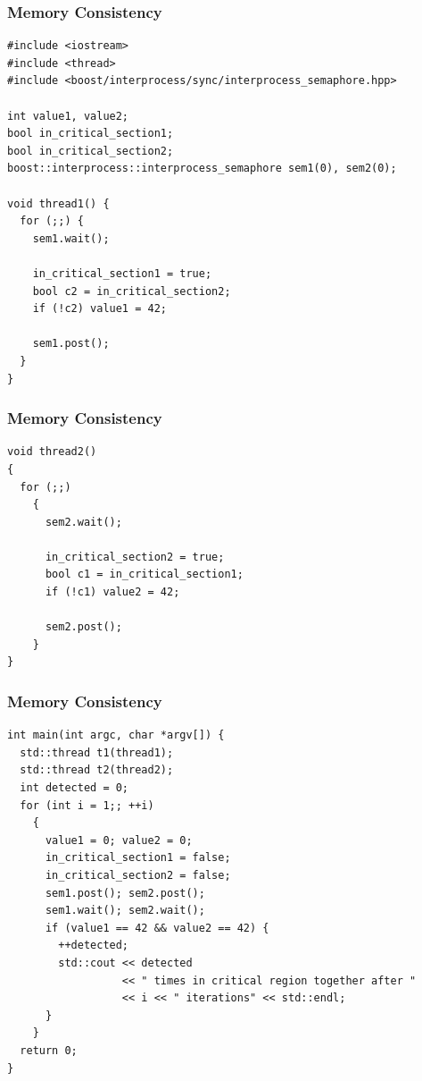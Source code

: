 \documentclass{beamer}
\begin{document}
\begin{frame}[fragile]
\frametitle{Memory Consistency}
\scriptsize
\begin{lstlisting}[linebackgroundcolor={\lstcolorlines{5,6,7,14,15,16}}]
#include <iostream>
#include <thread>
#include <boost/interprocess/sync/interprocess_semaphore.hpp>

int value1, value2;
bool in_critical_section1;
bool in_critical_section2;
boost::interprocess::interprocess_semaphore sem1(0), sem2(0);

void thread1() {
  for (;;) {
    sem1.wait();

    in_critical_section1 = true;
    bool c2 = in_critical_section2;
    if (!c2) value1 = 42;

    sem1.post();
  }
}
\end{lstlisting}

\end{frame}

\begin{frame}[fragile]
\frametitle{Memory Consistency}
\scriptsize
\begin{lstlisting}[linebackgroundcolor={\lstcolorlines{7,8,9}}]
void thread2()
{
  for (;;)
    {
      sem2.wait();

      in_critical_section2 = true;
      bool c1 = in_critical_section1;
      if (!c1) value2 = 42;

      sem2.post();
    }
}
\end{lstlisting}

\end{frame}

\begin{frame}[fragile]
\frametitle{Memory Consistency}
\scriptsize
\begin{lstlisting}[linebackgroundcolor={\lstcolorlines{7,8,9,12,13}}]
int main(int argc, char *argv[]) {
  std::thread t1(thread1);
  std::thread t2(thread2);
  int detected = 0;
  for (int i = 1;; ++i)
    {
      value1 = 0; value2 = 0;
      in_critical_section1 = false;
      in_critical_section2 = false;
      sem1.post(); sem2.post();
      sem1.wait(); sem2.wait();
      if (value1 == 42 && value2 == 42) {
        ++detected;
        std::cout << detected
                  << " times in critical region together after "
                  << i << " iterations" << std::endl;
      }
    }
  return 0;
}
\end{lstlisting}

\end{frame}
\end{document}
